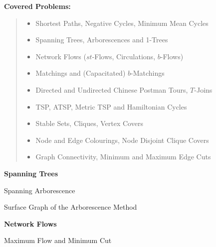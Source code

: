 \documentclass{report}
\begin{document}
\begin{landscape}
\clearpage
{\Huge\bf Covered Problems:}
{\huge
\vspace*{1cm}
\begin{quote}
\begin{itemize}
\item Shortest Paths, Negative Cycles, Minimum Mean Cycles
\item Spanning Trees, Arborescences and 1-Trees
\item Network Flows ($st$-Flows, Circulations, $b$-Flows)
\item Matchings and (Capacitated) $b$-Matchings
\item Directed and Undirected Chinese Postman Tours, $T$-Joins
\item TSP, ATSP, Metric TSP and Hamiltonian Cycles
\item Stable Sets, Cliques, Vertex Covers
\item Node and Edge Colourings, Node Disjoint Clique Covers
\item Graph Connectivity, Minimum and Maximum Edge Cuts
\end{itemize}
\end{quote}}


\clearpage
{\Huge\bf Spanning Trees}

\vspace*{3cm}
\begin{minipage}{11cm}
\begin{center}
{\huge Spanning Arborescence}
\vspace*{1.5cm}

\hspace*{0cm}
\epsfxsize=11cm
\end{center}
\end{minipage}
\begin{minipage}{14cm}
\begin{center}
\hspace*{0cm}
\epsfxsize=11.5cm

\vspace*{2cm}
{\huge Surface Graph of the Arborescence Method}
\end{center}
\end{minipage}


\clearpage
{\Huge\bf Network Flows}

\vspace*{2cm}
\begin{minipage}{11cm}
\begin{center}
{\huge Maximum Flow and Minimum Cut}
\vspace*{2cm}


\end{center}
\end{minipage}
\end{landscape}
\end{document}
